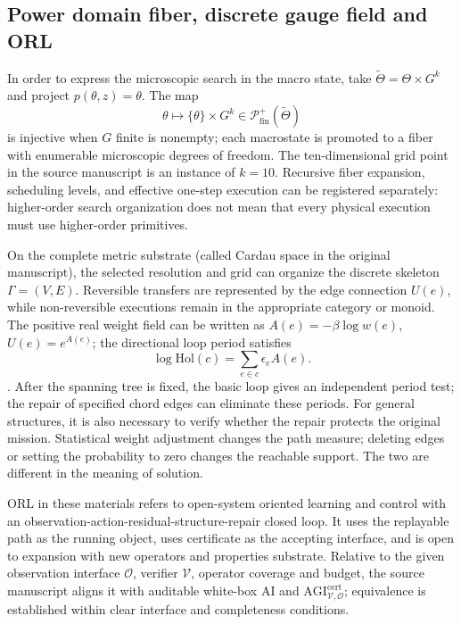 \documentclass[11pt,a4paper]{article}
\theoremstyle{plain}
\theoremstyle{definition}
\theoremstyle{remark}
\begin{document}
\begin{CJK*}
\subsection { Power domain fiber, discrete gauge field and ORL }

In order to express the microscopic search in the macro state, take $\widetilde\Theta=\Theta\times G^k$ and project $p(\theta,z)=\theta$. The map \[
 \theta\longmapsto\{\theta\}\times G^k
 \in\mathcal P^+_{\mathrm{fin}}(\widetilde\Theta)
\] is injective when $G$ finite is nonempty; each macrostate is promoted to a fiber with enumerable microscopic degrees of freedom. The ten-dimensional grid point in the source manuscript is an instance of $k=10$. Recursive fiber expansion, scheduling levels, and effective one-step execution can be registered separately: higher-order search organization does not mean that every physical execution must use higher-order primitives. \cite{S16}

On the complete metric substrate (called Cardau space in the original manuscript), the selected resolution and grid can organize the discrete skeleton $\Gamma=(V,E)$. Reversible transfers are represented by the edge connection $U(e)$, while non-reversible executions remain in the appropriate category or monoid. The positive real weight field can be written as $A(e)=-\beta\log w(e)$, $U(e)=e^{A(e)}$; the directional loop period satisfies \[
 \log\mathrm{Hol}(c)=\sum_{e\in c}\epsilon_eA(e).
\]. After the spanning tree is fixed, the basic loop gives an independent period test; the repair of specified chord edges can eliminate these periods. For general structures, it is also necessary to verify whether the repair protects the original mission. Statistical weight adjustment changes the path measure; deleting edges or setting the probability to zero changes the reachable support. The two are different in the meaning of solution.

ORL in these materials refers to open-system oriented learning and control with an observation-action-residual-structure-repair closed loop. It uses the replayable path as the running object, uses certificate as the accepting interface, and is open to expansion with new operators and properties substrate. Relative to the given observation interface $\mathcal O$, verifier $\mathcal V$, operator coverage and budget, the source manuscript aligns it with auditable white-box AI and $\mathrm{AGI}^{\mathrm{cert}}_{\mathcal V,\mathcal O}$; equivalence is established within clear interface and completeness conditions.


\end{CJK*}
\end{document}
